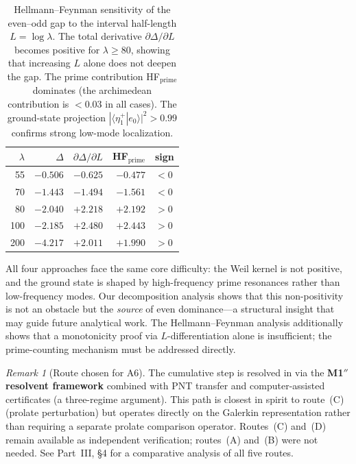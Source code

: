 \documentclass[12pt,a4paper]{article}
\theoremstyle{definition}
\theoremstyle{remark}
\newtheorem{remark}[theorem]{Remark}
\begin{document}
\begin{table}[h]
\centering
\renewcommand{\arraystretch}{1.15}
\begin{tabular}{r|r|r|r|l}
$\lambda$ & $\Delta$ & $\partial\Delta/\partial L$ & HF$_{\mathrm{prime}}$ & sign \\\hline
55  & $-0.506$ & $-0.625$ & $-0.477$ & $<0$ \\
70  & $-1.443$ & $-1.494$ & $-1.561$ & $<0$ \\
80  & $-2.040$ & $+2.218$ & $+2.192$ & $>0$ \\
100 & $-2.185$ & $+2.480$ & $+2.443$ & $>0$ \\
200 & $-4.217$ & $+2.011$ & $+1.990$ & $>0$ \\
\end{tabular}
\caption{Hellmann--Feynman sensitivity of the even--odd gap to the interval half-length $L = \log\lambda$. The total derivative $\partial\Delta/\partial L$ becomes positive for $\lambda \geq 80$, showing that increasing $L$ alone does not deepen the gap. The prime contribution HF$_{\mathrm{prime}}$ dominates (the archimedean contribution is $< 0.03$ in all cases). The ground-state projection $|\langle \eta^+_1 | e_0 \rangle|^2 > 0.99$ confirms strong low-mode localization.}
\label{tab:hf-results}
\end{table}

All four approaches face the same core difficulty: the Weil kernel is not positive, and the ground state is shaped by high-frequency prime resonances rather than low-frequency modes. Our decomposition analysis shows that this non-positivity is not an obstacle but the \emph{source} of even dominance---a structural insight that may guide future analytical work. The Hellmann--Feynman analysis additionally shows that a monotonicity proof via $L$-differentiation alone is insufficient; the prime-counting mechanism must be addressed directly.

\begin{remark}[Route chosen for A6]
The cumulative step is resolved in  via the \textbf{M1$''$ resolvent framework} combined with PNT transfer and computer-assisted certificates (a three-regime argument). This path is closest in spirit to route~(C) (prolate perturbation) but operates directly on the Galerkin representation rather than requiring a separate prolate comparison operator. Routes~(C) and~(D) remain available as independent verification; routes~(A) and~(B) were not needed. See Part~III, \S4 for a comparative analysis of all five routes.
\end{remark}
\end{document}

